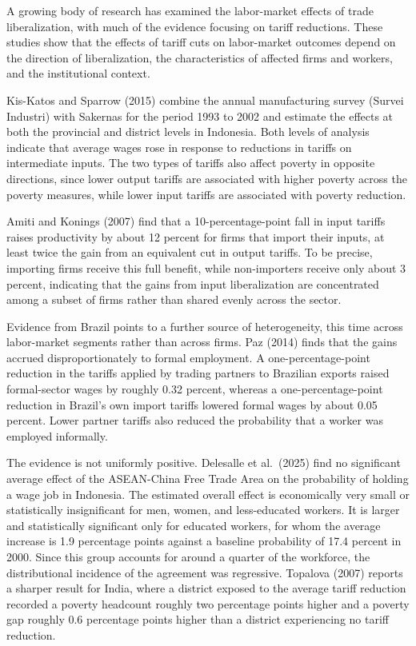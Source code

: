 \documentclass[
  manuscript=article,
  layout=publish,
  year=2026,
  volume=1,
]{den}
\begin{document}
A growing body of research has examined the labor-market effects of
trade liberalization, with much of the evidence focusing on tariff
reductions. These studies show that the effects of tariff cuts on
labor-market outcomes depend on the direction of liberalization, the
characteristics of affected firms and workers, and the institutional
context.

Kis-Katos and Sparrow (2015) combine the annual manufacturing survey
(Survei Industri) with Sakernas for the period 1993 to 2002 and estimate
the effects at both the provincial and district levels in Indonesia.
Both levels of analysis indicate that average wages rose in response to
reductions in tariffs on intermediate inputs. The two types of tariffs
also affect poverty in opposite directions, since lower output tariffs
are associated with higher poverty across the poverty measures, while
lower input tariffs are associated with poverty reduction.

Amiti and Konings (2007) find that a 10-percentage-point fall in input
tariffs raises productivity by about 12 percent for firms that import
their inputs, at least twice the gain from an equivalent cut in output
tariffs. To be precise, importing firms receive this full benefit, while
non-importers receive only about 3 percent, indicating that the gains
from input liberalization are concentrated among a subset of firms
rather than shared evenly across the sector.

Evidence from Brazil points to a further source of heterogeneity, this
time across labor-market segments rather than across firms. Paz (2014)
finds that the gains accrued disproportionately to formal employment. A
one-percentage-point reduction in the tariffs applied by trading
partners to Brazilian exports raised formal-sector wages by roughly 0.32
percent, whereas a one-percentage-point reduction in Brazil's own import
tariffs lowered formal wages by about 0.05 percent. Lower partner
tariffs also reduced the probability that a worker was employed
informally.

The evidence is not uniformly positive. Delesalle et al.~(2025) find no
significant average effect of the ASEAN-China Free Trade Area on the
probability of holding a wage job in Indonesia. The estimated overall
effect is economically very small or statistically insignificant for
men, women, and less-educated workers. It is larger and statistically
significant only for educated workers, for whom the average increase is
1.9 percentage points against a baseline probability of 17.4 percent in
2000. Since this group accounts for around a quarter of the workforce,
the distributional incidence of the agreement was regressive. Topalova
(2007) reports a sharper result for India, where a district exposed to
the average tariff reduction recorded a poverty headcount roughly two
percentage points higher and a poverty gap roughly 0.6 percentage points
higher than a district experiencing no tariff reduction.
\end{document}
